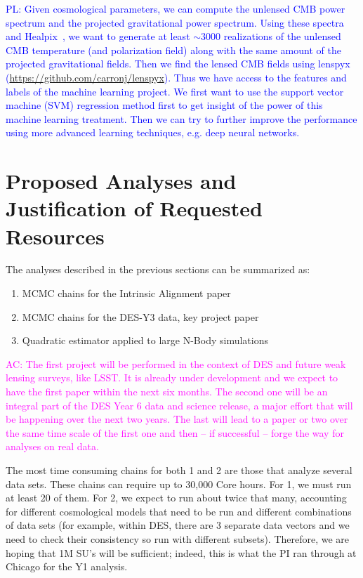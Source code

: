 \documentclass[12pt]{article}
\newcommand{\acampos}[1]{\textcolor{magenta}{AC: #1}}
\newcommand{\peikai}[1]{\textcolor{blue}{PL: #1}}
\begin{document}
\begin{small}
\peikai{Given cosmological parameters, we can compute the unlensed CMB power spectrum and the projected gravitational power spectrum. Using these spectra and Healpix~\cite{Gorski:2004by}, we want to generate at least $\sim 3000$ realizations of the unlensed CMB temperature (and polarization field) along with the same amount of the projected gravitational fields. Then we find the lensed CMB fields using lenspyx (\url{https://github.com/carronj/lenspyx}). Thus we have access to the features and labels of the machine learning project. We first want to use the support vector machine (SVM) regression method first to get insight of the power of this machine learning treatment. Then we can try to further improve the performance using more advanced learning techniques, e.g. deep neural networks.}

\section{Proposed Analyses and Justification of Requested Resources}

The analyses described in the previous sections can be summarized as:
\begin{enumerate}
\item MCMC chains for the Intrinsic Alignment paper
\item MCMC chains for the DES-Y3 data, key project paper
\item Quadratic estimator applied to large N-Body simulations
\end{enumerate}
\acampos{The first project will be performed in the context of DES and future weak lensing surveys, like LSST. It is already under development and we expect to have the first paper within the next six months. The second one will be an integral part of the DES Year 6 data and science release, a major effort that will be happening over the next two years. The last will lead to a paper or two over the same time scale of the first one and then -- if successful -- forge the way for analyses on real data.}


The most time consuming chains for both 1 and 2 are those that analyze several data sets.%
These chains can require up to 30,000 Core hours. For 1, we must run at least 20 of them. %
For 2, we expect to run about twice that many, accounting for different cosmological models that need to be run and different combinations of data sets (for example, within DES, there are 3 separate data vectors and we need to check their consistency so run with different subsets). Therefore, we are hoping that 1M SU's will be sufficient; indeed, this is what the PI ran through at Chicago for the Y1 analysis.


\end{small}
\end{document}
